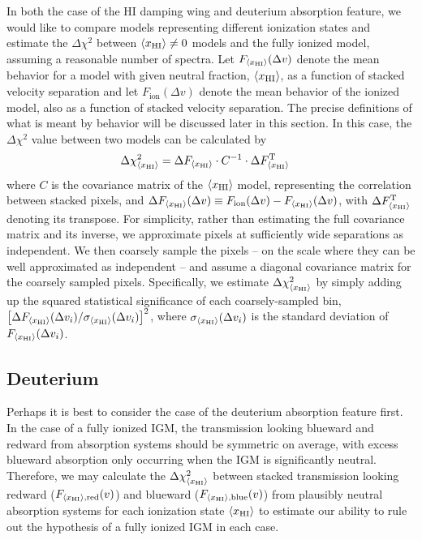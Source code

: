 In both the case of the HI damping wing and deuterium absorption feature, we would like to compare models representing different ionization states and estimate the $\Delta \chi^2$ between $\langle x_{\text{HI}}\rangle \neq 0$ models and the fully ionized model, assuming a reasonable number of spectra. Let $F_{\langle x_{\text{HI}}\rangle}(\Delta v)$ denote the mean behavior for a model with given neutral fraction, $\langle x_{\text{HI}}\rangle$, as a function of stacked velocity separation and let $F_{\text{ion}}(\Delta v)$ denote the mean behavior of the ionized model, also as a function of stacked velocity separation. The precise definitions of what is meant by behavior will be discussed later in this section. In this case, the $\Delta \chi^2$ value between two models can be calculated by
\begin{align}
\Delta \chi^2_{\langle x_{\text{HI}}\rangle} &= \Delta F_{\langle x_{\text{HI}}\rangle} \cdot C^{-1} \cdot \Delta F_{\langle x_{\text{HI}}\rangle}^{\text{T}} \label{eq:ChiSquare}
\end{align}
where $C$ is the covariance matrix of the $\langle x_{\text{HI}}\rangle$ model, representing the correlation between stacked pixels, and $\Delta F_{\langle x_{\text{HI}}\rangle}(\Delta v) \equiv F_{\text{ion}}(\Delta v) - F_{\langle x_{\text{HI}}\rangle}(\Delta v)$, with $\Delta F_{\langle x_{\text{HI}}\rangle}^{\text{T}}$ denoting its transpose. For simplicity, rather than estimating the full covariance matrix and its inverse, we approximate pixels at sufficiently wide separations as independent. We
then coarsely sample the pixels -- on the scale where they can be well approximated as independent -- and assume a diagonal covariance matrix for the coarsely sampled pixels. Specifically,
we estimate  $\Delta \chi^{2}_{\langle x_{\text{HI}}\rangle}$ by simply adding up the squared statistical significance of each coarsely-sampled bin, $\left[\Delta F_{\langle x_{\text{HI}}\rangle}(\Delta v_i)/\sigma_{\langle x_{\text{HI}}\rangle}(\Delta v_i)\right]^2$, where $\sigma_{\langle x_{\text{HI}}\rangle}(\Delta v_i)$ is the standard deviation of $F_{\langle x_{\text{HI}}\rangle}(\Delta v_i)$. 




\subsection{Deuterium} \label{sec:NeutralIslandsDForecast}

 Perhaps it is best to consider the case of the deuterium absorption feature first. In the case of a fully ionized IGM, the transmission looking blueward and redward from absorption systems should be symmetric on average, with excess blueward absorption only occurring when the IGM is significantly neutral. Therefore, we may calculate the $\Delta \chi_{\langle x_{\text{HI}}\rangle}^2$ between stacked transmission looking redward ($F_{\langle x_{\text{HI}}\rangle,\text{red}}(v)$) and blueward ($F_{\langle x_{\text{HI}}\rangle,\text{blue}}(v)$) from plausibly neutral absorption systems for each ionization state $\langle x_{\text{HI}}\rangle$ to estimate our ability to rule out the hypothesis of a fully ionized IGM in each case. 
 
